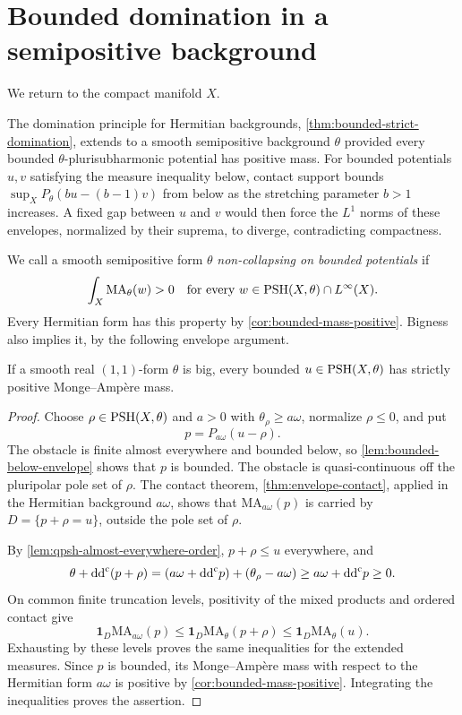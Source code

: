 

\section{Bounded domination in a semipositive background}

We return to the compact manifold $X$.

The domination principle for Hermitian backgrounds, \cref{thm:bounded-strict-domination}, extends to a smooth semipositive background $\theta$ provided every bounded $\theta$-plurisubharmonic potential has positive mass. For bounded potentials $u,v$ satisfying the measure inequality below, contact support bounds $\sup_XP_\theta(bu-(b-1)v)$ from below as the stretching parameter $b>1$ increases. A fixed gap between $u$ and $v$ would then force the $L^1$ norms of these envelopes, normalized by their suprema, to diverge, contradicting compactness.

We call a smooth semipositive form $\theta$ \emph{non-collapsing on bounded potentials} if
\[
 \int_X\mathrm{MA}_\theta(w)>0
 \quad\hbox{for every }w\in\mathrm{PSH}(X,\theta)\cap L^\infty(X).
\]
Every Hermitian form has this property by \cref{cor:bounded-mass-positive}. Bigness also implies it, by the following envelope argument.

\begin{proposition}\label{prop:big-noncollapsing}
If a smooth real $(1,1)$-form $\theta$ is big, every bounded $u\in\mathrm{PSH}(X,\theta)$ has strictly positive Monge--Amp\`ere mass.
\end{proposition}
\begin{proof}
Choose $\rho\in\mathrm{PSH}(X,\theta)$ and $a>0$ with $\theta_\rho\geq a\omega$, normalize $\rho\leq0$, and put
\[
 p=P_{a\omega}(u-\rho).
\]
The obstacle is finite almost everywhere and bounded below, so \cref{lem:bounded-below-envelope} shows that $p$ is bounded. The obstacle is quasi-continuous off the pluripolar pole set of $\rho$. The contact theorem, \cref{thm:envelope-contact}, applied in the Hermitian background $a\omega$, shows that $\mathrm{MA}_{a\omega}(p)$ is carried by
$D=\{p+\rho=u\}$, outside the pole set of $\rho$.

By \cref{lem:qpsh-almost-everywhere-order}, $p+\rho\leq u$ everywhere, and
\[
 \theta+\mathrm{dd}^{\mathrm{c}}(p+\rho)
 =(a\omega+\mathrm{dd}^{\mathrm{c}} p)+(\theta_\rho-a\omega)
 \geq a\omega+\mathrm{dd}^{\mathrm{c}} p\geq0.
\]
On common finite truncation levels, positivity of the mixed products and ordered contact give
\[
 \mathbf1_D\mathrm{MA}_{a\omega}(p)
 \leq\mathbf1_D\mathrm{MA}_\theta(p+\rho)
 \leq\mathbf1_D\mathrm{MA}_\theta(u).
\]
Exhausting by these levels proves the same inequalities for the extended measures. Since $p$ is bounded, its Monge--Amp\`ere mass with respect to the Hermitian form $a\omega$ is positive by \cref{cor:bounded-mass-positive}. Integrating the inequalities proves the assertion.
\end{proof}

